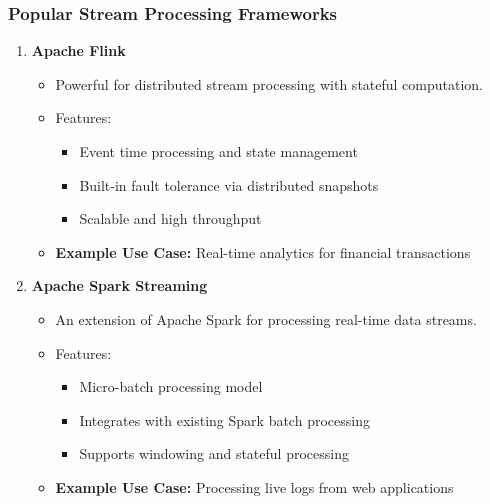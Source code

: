 \documentclass[aspectratio=169]{beamer}
\begin{document}
\begin{frame}
    \frametitle{Popular Stream Processing Frameworks}
    \begin{enumerate}
        \item \textbf{Apache Flink}
        \begin{itemize}
            \item Powerful for distributed stream processing with stateful computation.
            \item Features:
            \begin{itemize}
                \item Event time processing and state management
                \item Built-in fault tolerance via distributed snapshots
                \item Scalable and high throughput
            \end{itemize}
            \item \textbf{Example Use Case:} Real-time analytics for financial transactions
        \end{itemize}
        
        \item \textbf{Apache Spark Streaming}
        \begin{itemize}
            \item An extension of Apache Spark for processing real-time data streams.
            \item Features:
            \begin{itemize}
                \item Micro-batch processing model
                \item Integrates with existing Spark batch processing
                \item Supports windowing and stateful processing
            \end{itemize}
            \item \textbf{Example Use Case:} Processing live logs from web applications
        \end{itemize}
    \end{enumerate}
\end{frame}
\end{document}
